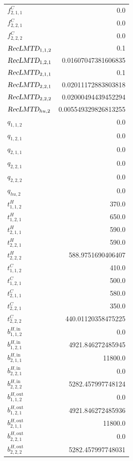 \documentclass{article}%
\begin{document}
\begin{multicols*}{3}
\begin{supertabular}{lr}
	$f_{2,1,1}^{C}$ & 0.0 \\%
	$f_{2,2,1}^{C}$ & 0.0 \\%
	$f_{2,2,2}^{C}$ & 0.0 \\%
	$\textsl{RecLMTD}_{1,1,2}$ & 0.1 \\%
	$\textsl{RecLMTD}_{1,2,1}$ & 0.01607047381606835 \\%
	$\textsl{RecLMTD}_{2,1,1}$ & 0.1 \\%
	$\textsl{RecLMTD}_{2,2,1}$ & 0.02011172883803818 \\%
	$\textsl{RecLMTD}_{2,2,2}$ & 0.02000494439452294 \\%
	$\textsl{RecLMTD}_{hu,2}$ & 0.005549329826813255 \\%
	$q_{1,1,2}$ & 0.0 \\%
	$q_{1,2,1}$ & 0.0 \\%
	$q_{2,1,1}$ & 0.0 \\%
	$q_{2,2,1}$ & 0.0 \\%
	$q_{2,2,2}$ & 0.0 \\%
	$q_{hu,2}$ & 0.0 \\%
	$t_{1,1,2}^{H}$ & 370.0 \\%
	$t_{1,2,1}^{H}$ & 650.0 \\%
	$t_{2,1,1}^{H}$ & 590.0 \\%
	$t_{2,2,1}^{H}$ & 590.0 \\%
	$t_{2,2,2}^{H}$ & 588.9751690406407 \\%
	$t_{1,1,2}^{C}$ & 410.0 \\%
	$t_{1,2,1}^{C}$ & 500.0 \\%
	$t_{2,1,1}^{C}$ & 580.0 \\%
	$t_{2,2,1}^{C}$ & 350.0 \\%
	$t_{2,2,2}^{C}$ & 440.01120358475225 \\%
	$b_{1,1,2}^{H,\text{in}}$ & 0.0 \\%
	$b_{1,2,1}^{H,\text{in}}$ & 4921.846272485945 \\%
	$b_{2,1,1}^{H,\text{in}}$ & 11800.0 \\%
	$b_{2,2,1}^{H,\text{in}}$ & 0.0 \\%
	$b_{2,2,2}^{H,\text{in}}$ & 5282.457997748124 \\%
	$b_{1,1,2}^{H,\text{out}}$ & 0.0 \\%
	$b_{1,2,1}^{H,\text{out}}$ & 4921.846272485936 \\%
	$b_{2,1,1}^{H,\text{out}}$ & 11800.0 \\%
	$b_{2,2,1}^{H,\text{out}}$ & 0.0 \\%
	$b_{2,2,2}^{H,\text{out}}$ & 5282.457997748031 \\%

\end{supertabular}
\end{multicols*}
\end{document}
